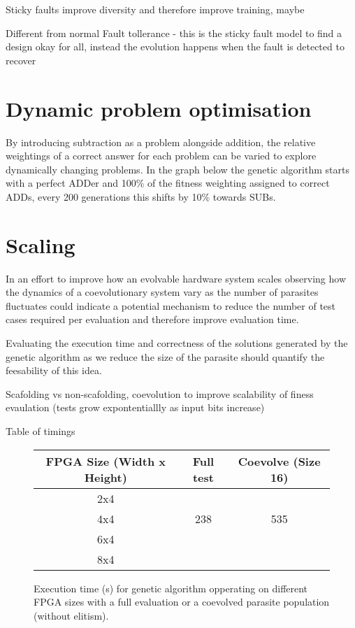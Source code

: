 Sticky faults improve diversity and therefore improve training, maybe

Different from normal Fault tollerance - this is the sticky fault model to find a design okay for all, instead the evolution happens when the fault is detected to recover

\section{Dynamic problem optimisation}
By introducing subtraction as a problem alongside addition, the relative weightings of a correct answer for each problem can be varied to explore dynamically changing problems. In the graph below the genetic algorithm starts with a perfect ADDer and 100\% of the fitness weighting assigned to correct ADDs, every 200 generations this shifts by 10\% towards SUBs.

\section{Scaling \label{s:scaling}}
In an effort to improve how an evolvable hardware system scales observing
how the dynamics of a coevolutionary system vary as the number of parasites
fluctuates could indicate a potential mechanism to reduce the number of
test cases required per evaluation and therefore improve evaluation time.

Evaluating the execution time and correctness of the solutions generated
by the genetic algorithm as we reduce the size of the parasite should
quantify the feesability of this idea.

Scafolding vs non-scafolding, coevolution to improve scalability of finess evaulation (tests grow expontentiallly as input bits increase)

Table of timings
\begin{figure}
	\centering
\begin{tabular}{ccc}
	\toprule
	\bfseries{FPGA Size (Width x Height)} & \bfseries{Full test} & \bfseries{Coevolve (Size 16)}\\
	\midrule
	2x4 & & \\
	4x4 & 238 & 535\\
	6x4 & & \\
	8x4 & & \\
	\bottomrule
\end{tabular}
\caption{Execution time (s) for genetic algorithm opperating on different FPGA sizes with
a full evaluation or a coevolved parasite population (without elitism).}
\end{figure}

